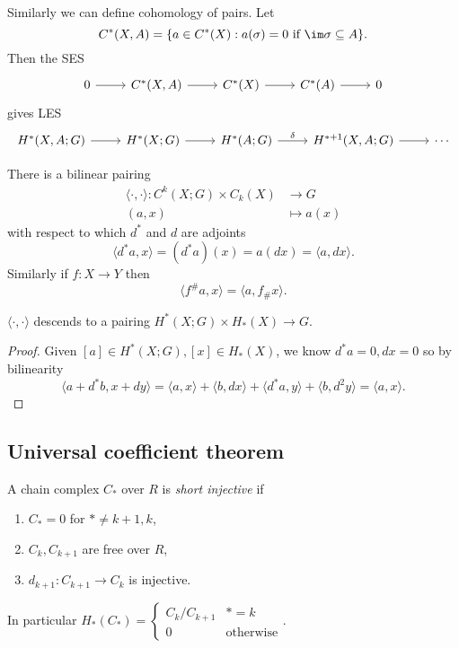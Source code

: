 \documentclass[a4paper]{article}
\begin{document}
Similarly we can define cohomology of pairs. Let
\[
  C^*(X, A) = \{a \in C^*(X): a(\sigma) = 0 \text{ if } \im \sigma \subseteq A\}.
\]
Then the SES
\[
  \begin{tikzcd}
    0 \ar[r] & C^*(X, A) \ar[r] & C^*(X) \ar[r] & C^*(A) \ar[r] & 0
  \end{tikzcd}
\]
gives LES
\[
  \begin{tikzcd}
    H^*(X, A; G) \ar[r] & H^*(X; G) \ar[r] & H^*(A; G) \ar[r, "\delta"] & H^{* + 1}(X, A; G) \ar[r] & \cdots
  \end{tikzcd}
\]

There is a bilinear pairing
\begin{align*}
  \langle \cdot, \cdot \rangle: C^k(X; G) \times C_k(X) &\to G \\
  (a, x) &\mapsto a(x)
\end{align*}
with respect to which \(d^*\) and \(d\) are adjoints
\[
  \langle d^*a, x \rangle = (d^*a)(x) = a(dx) = \langle a, dx \rangle.
\]
Similarly if \(f: X \to Y\) then
\[
  \langle f^\#a, x \rangle = \langle a, f_\# x \rangle.
\]

\begin{lemma}
  \(\langle \cdot, \cdot \rangle\) descends to a pairing \(H^*(X; G) \times H_*(X) \to G\).
\end{lemma}

\begin{proof}
  Given \([a] \in H^*(X; G), [x] \in H_*(X)\), we know \(d^*a = 0, d x = 0\) so by bilinearity
  \[
    \langle a + d^* b, x + dy \rangle
    = \langle a, x \rangle + \langle b, dx \rangle + \langle d^*a, y \rangle + \langle b, d^2 y\rangle
    = \langle a, x \rangle.
  \]
\end{proof}

\subsection{Universal coefficient theorem}

\begin{definition}
  A chain complex \(C_*\) over \(R\) is \emph{short injective} if
  \begin{enumerate}
  \item \(C_* = 0\) for \(* \neq k + 1, k\),
  \item \(C_k, C_{k + 1}\) are free over \(R\),
  \item \(d_{k + 1}: C_{k + 1} \to C_k\) is injective.
  \end{enumerate}
\end{definition}
In particular \(H_*(C_*) =
\begin{cases}
  C_k/C_{k + 1} & * = k \\
  0 & \text{otherwise}
\end{cases}
\).
\end{document}
